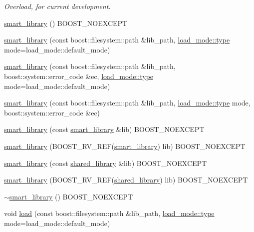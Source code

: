 \begin{DoxyCompactItemize}
\begin{DoxyCompactList}\small\item\em Overload, for current development. \end{DoxyCompactList}\item 
\hyperlink{a00281_af1fa4c4ed871e889f92f4c11d574d91f}{smart\+\_\+library} () B\+O\+O\+S\+T\+\_\+\+N\+O\+E\+X\+C\+E\+PT
\item 
\hyperlink{a00281_af88521398a2110952dd5d0820b3b4deb}{smart\+\_\+library} (const boost\+::filesystem\+::path \&lib\+\_\+path, \hyperlink{a00729_a1918a602801479bc0bade54ff5665129}{load\+\_\+mode\+::type} mode=load\+\_\+mode\+::default\+\_\+mode)
\item 
\hyperlink{a00281_a9f3200c39d61f10b1a3001adbf2ecd0b}{smart\+\_\+library} (const boost\+::filesystem\+::path \&lib\+\_\+path, boost\+::system\+::error\+\_\+code \&ec, \hyperlink{a00729_a1918a602801479bc0bade54ff5665129}{load\+\_\+mode\+::type} mode=load\+\_\+mode\+::default\+\_\+mode)
\item 
\hyperlink{a00281_a941e7e08eaf01af2d6fd83f04465b4b6}{smart\+\_\+library} (const boost\+::filesystem\+::path \&lib\+\_\+path, \hyperlink{a00729_a1918a602801479bc0bade54ff5665129}{load\+\_\+mode\+::type} mode, boost\+::system\+::error\+\_\+code \&ec)
\item 
\hyperlink{a00281_aba01915dd665585b9a694878a8f2d9b8}{smart\+\_\+library} (const \hyperlink{a00281}{smart\+\_\+library} \&lib) B\+O\+O\+S\+T\+\_\+\+N\+O\+E\+X\+C\+E\+PT
\item 
\hyperlink{a00281_a4788c9d72aa2f5108d6273b0ec6cc5d9}{smart\+\_\+library} (B\+O\+O\+S\+T\+\_\+\+R\+V\+\_\+\+R\+EF(\hyperlink{a00281}{smart\+\_\+library}) lib) B\+O\+O\+S\+T\+\_\+\+N\+O\+E\+X\+C\+E\+PT
\item 
\hyperlink{a00281_a5d3a9bc4a90fd70313ed193ec090d5f0}{smart\+\_\+library} (const \hyperlink{a00271}{shared\+\_\+library} \&lib) B\+O\+O\+S\+T\+\_\+\+N\+O\+E\+X\+C\+E\+PT
\item 
\hyperlink{a00281_a87ba6326545541fe3c016488ec168e82}{smart\+\_\+library} (B\+O\+O\+S\+T\+\_\+\+R\+V\+\_\+\+R\+EF(\hyperlink{a00271}{shared\+\_\+library}) lib) B\+O\+O\+S\+T\+\_\+\+N\+O\+E\+X\+C\+E\+PT
\item 
\hyperlink{a00281_ae832b6930c08e751321df14ad7a9a190}{$\sim$smart\+\_\+library} () B\+O\+O\+S\+T\+\_\+\+N\+O\+E\+X\+C\+E\+PT
\item 
void \hyperlink{a00281_af80edac534fd278f4f162ac3abadfc2b}{load} (const boost\+::filesystem\+::path \&lib\+\_\+path, \hyperlink{a00729_a1918a602801479bc0bade54ff5665129}{load\+\_\+mode\+::type} mode=load\+\_\+mode\+::default\+\_\+mode)

\end{DoxyCompactItemize}
